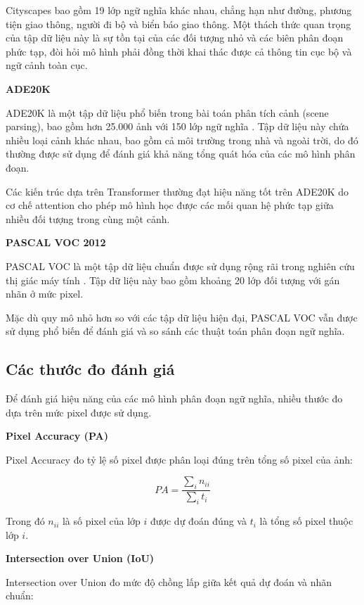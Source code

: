 Cityscapes bao gồm 19 lớp ngữ nghĩa khác nhau, chẳng hạn như đường, phương tiện giao thông, người đi bộ và biển báo giao thông. 
Một thách thức quan trọng của tập dữ liệu này là sự tồn tại của các đối tượng nhỏ và các biên phân đoạn phức tạp, đòi hỏi mô hình phải đồng thời khai thác được cả thông tin cục bộ và ngữ cảnh toàn cục.

\textbf{ADE20K}

ADE20K là một tập dữ liệu phổ biến trong bài toán phân tích cảnh (scene parsing), bao gồm hơn 25.000 ảnh với 150 lớp ngữ nghĩa \cite{zhou2017scene}. 
Tập dữ liệu này chứa nhiều loại cảnh khác nhau, bao gồm cả môi trường trong nhà và ngoài trời, do đó thường được sử dụng để đánh giá khả năng tổng quát hóa của các mô hình phân đoạn.

Các kiến trúc dựa trên Transformer thường đạt hiệu năng tốt trên ADE20K do cơ chế attention cho phép mô hình học được các mối quan hệ phức tạp giữa nhiều đối tượng trong cùng một cảnh.

\textbf{PASCAL VOC 2012}

PASCAL VOC là một tập dữ liệu chuẩn được sử dụng rộng rãi trong nghiên cứu thị giác máy tính \cite{everingham2010pascal}. 
Tập dữ liệu này bao gồm khoảng 20 lớp đối tượng với gán nhãn ở mức pixel.

Mặc dù quy mô nhỏ hơn so với các tập dữ liệu hiện đại, PASCAL VOC vẫn được sử dụng phổ biến để đánh giá và so sánh các thuật toán phân đoạn ngữ nghĩa.

\subsection{Các thước đo đánh giá}

Để đánh giá hiệu năng của các mô hình phân đoạn ngữ nghĩa, nhiều thước đo dựa trên mức pixel được sử dụng.

\textbf{Pixel Accuracy (PA)}

Pixel Accuracy đo tỷ lệ số pixel được phân loại đúng trên tổng số pixel của ảnh:

\begin{equation}
PA = \frac{\sum_i n_{ii}}{\sum_i t_i}
\end{equation}

Trong đó $n_{ii}$ là số pixel của lớp $i$ được dự đoán đúng và $t_i$ là tổng số pixel thuộc lớp $i$.

\textbf{Intersection over Union (IoU)}

Intersection over Union đo mức độ chồng lấp giữa kết quả dự đoán và nhãn chuẩn:


